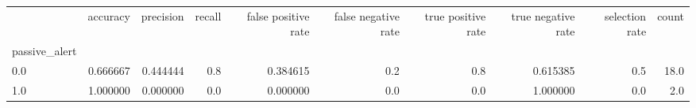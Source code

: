 \begin{tabular}{lrrrrrrrrr}
\toprule
{} &  accuracy &  precision &  recall &  false positive rate &  false negative rate &  true positive rate &  true negative rate &  selection rate &  count \\
passive\_alert &           &            &         &                      &                      &                     &                     &                 &        \\
\midrule
0.0           &  0.666667 &   0.444444 &     0.8 &             0.384615 &                  0.2 &                 0.8 &            0.615385 &             0.5 &   18.0 \\
1.0           &  1.000000 &   0.000000 &     0.0 &             0.000000 &                  0.0 &                 0.0 &            1.000000 &             0.0 &    2.0 \\
\bottomrule
\end{tabular}
